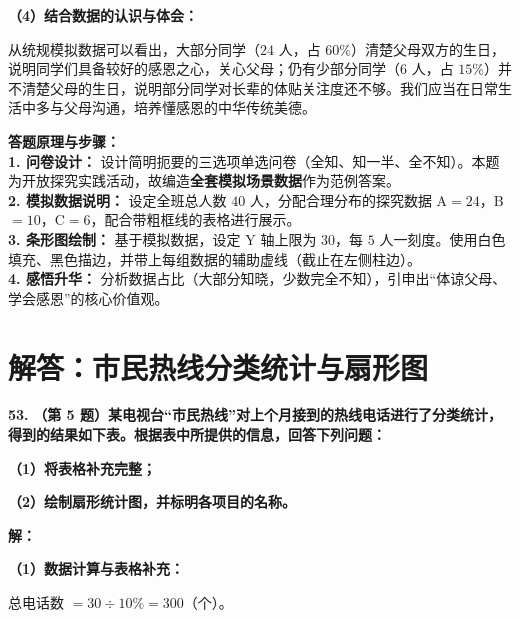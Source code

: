 \vspace{0.4cm}
\textbf{（4）结合数据的认识与体会：}

从统规模拟数据可以看出，大部分同学（$24$ 人，占 $60\%$）清楚父母双方的生日，说明同学们具备较好的感恩之心，关心父母；仍有少部分同学（$6$ 人，占 $15\%$）并不清楚父母的生日，说明部分同学对长辈的体贴关注度还不够。我们应当在日常生活中多与父母沟通，培养懂感恩的中华传统美德。

\vspace{0.4cm}
{\small\color{blue!70!black}
\textbf{答题原理与步骤：}\\
\textbf{1. 问卷设计：} 设计简明扼要的三选项单选问卷（全知、知一半、全不知）。本题为开放探究实践活动，故编造\textbf{全套模拟场景数据}作为范例答案。\\
\textbf{2. 模拟数据说明：} 设定全班总人数 $40$ 人，分配合理分布的探究数据 A$=24$，B$=10$，C$=6$，配合带粗框线的表格进行展示。\\
\textbf{3. 条形图绘制：} 基于模拟数据，设定 Y 轴上限为 $30$，每 $5$ 人一刻度。使用白色填充、黑色描边，并带上每组数据的辅助虚线（截止在左侧柱边）。\\
\textbf{4. 感悟升华：} 分析数据占比（大部分知晓，少数完全不知），引申出“体谅父母、学会感恩”的核心价值观。
}

\newpage



\newpage

\section{解答：市民热线分类统计与扇形图}

\vspace{0.6cm}

\textbf{\LARGE 53.} \textbf{（第 5 题）某电视台“市民热线”对上个月接到的热线电话进行了分类统计，得到的结果如下表。根据表中所提供的信息，回答下列问题：}

\textbf{（1）将表格补充完整；}

\textbf{（2）绘制扇形统计图，并标明各项目的名称。}

\vspace{0.4cm}
\textbf{解：}

\textbf{（1）数据计算与表格补充：}

总电话数 $= 30 \div 10\% = 300$（个）。

